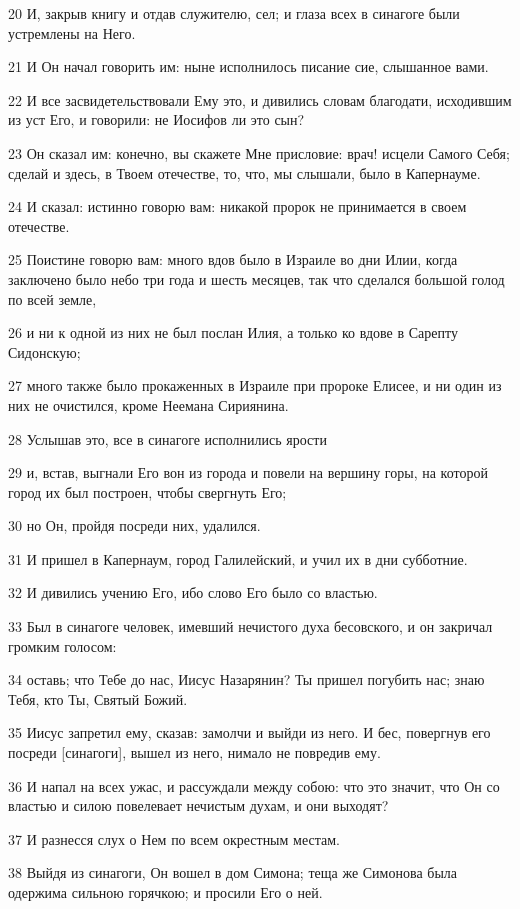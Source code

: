 \par 20 И, закрыв книгу и отдав служителю, сел; и глаза всех в синагоге были устремлены на Него.
\par 21 И Он начал говорить им: ныне исполнилось писание сие, слышанное вами.
\par 22 И все засвидетельствовали Ему это, и дивились словам благодати, исходившим из уст Его, и говорили: не Иосифов ли это сын?
\par 23 Он сказал им: конечно, вы скажете Мне присловие: врач! исцели Самого Себя; сделай и здесь, в Твоем отечестве, то, что, мы слышали, было в Капернауме.
\par 24 И сказал: истинно говорю вам: никакой пророк не принимается в своем отечестве.
\par 25 Поистине говорю вам: много вдов было в Израиле во дни Илии, когда заключено было небо три года и шесть месяцев, так что сделался большой голод по всей земле,
\par 26 и ни к одной из них не был послан Илия, а только ко вдове в Сарепту Сидонскую;
\par 27 много также было прокаженных в Израиле при пророке Елисее, и ни один из них не очистился, кроме Неемана Сириянина.
\par 28 Услышав это, все в синагоге исполнились ярости
\par 29 и, встав, выгнали Его вон из города и повели на вершину горы, на которой город их был построен, чтобы свергнуть Его;
\par 30 но Он, пройдя посреди них, удалился.
\par 31 И пришел в Капернаум, город Галилейский, и учил их в дни субботние.
\par 32 И дивились учению Его, ибо слово Его было со властью.
\par 33 Был в синагоге человек, имевший нечистого духа бесовского, и он закричал громким голосом:
\par 34 оставь; что Тебе до нас, Иисус Назарянин? Ты пришел погубить нас; знаю Тебя, кто Ты, Святый Божий.
\par 35 Иисус запретил ему, сказав: замолчи и выйди из него. И бес, повергнув его посреди [синагоги], вышел из него, нимало не повредив ему.
\par 36 И напал на всех ужас, и рассуждали между собою: что это значит, что Он со властью и силою повелевает нечистым духам, и они выходят?
\par 37 И разнесся слух о Нем по всем окрестным местам.
\par 38 Выйдя из синагоги, Он вошел в дом Симона; теща же Симонова была одержима сильною горячкою; и просили Его о ней.
